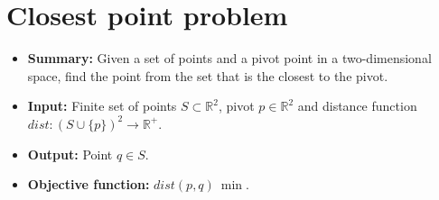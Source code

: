 \section{Closest point problem} \label{algorithm-closestpoint}
\begin{itemize}
    \item \textbf{Summary:} Given a set of points and a pivot point in a two-dimensional space, find the point from the set that is the closest to the pivot. 
    \item \textbf{Input:} Finite set of points $S \subset \mathbb{R}^2$, pivot $p \in \mathbb{R}^2$ and distance function $dist: (S \cup \{p\})^2 \rightarrow \mathbb{R}^+$.
    \item \textbf{Output:} Point $q \in S$.
    \item \textbf{Objective function:} $dist(p, q)~\min$.
\end{itemize}

